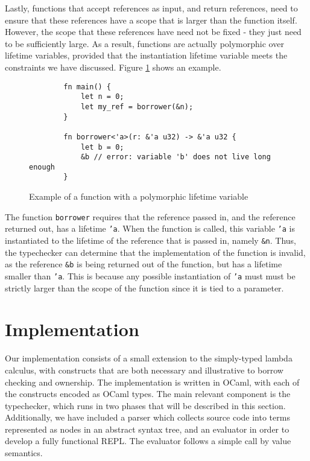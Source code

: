 \documentclass[letterpaper,11pt]{article}
\begin{document}
Lastly, functions that accept references as input, and return references, need to
ensure that these references have a scope that is larger than the function itself.
However, the scope that these references have need not be fixed - they just need
to be sufficiently large. As a result, functions are actually polymorphic over
lifetime variables, provided that the instantiation lifetime variable meets
the constraints we have discussed. Figure \ref{lfpolyex} shows an example.
\begin{figure}[h]
    \begin{lstlisting}
        fn main() {
            let n = 0;
            let my_ref = borrower(&n);
        }

        fn borrower<'a>(r: &'a u32) -> &'a u32 {
            let b = 0;
            &b // error: variable 'b' does not live long enough 
        }
    \end{lstlisting}
    \caption{Example of a function with a polymorphic lifetime variable}
    \label{lfpolyex}
\end{figure}
The function \texttt{borrower} requires that the reference passed in, and the
reference returned out, has a lifetime \texttt{'a}. When the function is called,
this variable \texttt{'a} is instantiated to the lifetime of the reference that
is passed in, namely \texttt{\&n}. Thus, the typechecker can determine that
the implementation of the function is invalid, as the reference \texttt{\&b} is
being returned out of the function, but has a lifetime smaller than \texttt{'a}.
This is because any possible instantiation of \texttt{'a} must must be strictly larger than the scope of the function since
it is tied to a parameter.

\section{Implementation}
Our implementation consists of a small extension to the simply-typed lambda calculus,
with constructs that are both necessary and illustrative to borrow checking and ownership. The
implementation is written in OCaml, with each of the constructs encoded as
OCaml types. The main relevant component is the typechecker, which runs in two
phases that will be described in this section. Additionally, we have included a
parser which collects source code into terms represented as nodes in an abstract syntax tree, 
and an evaluator in order to develop a fully functional REPL. The evaluator follows a simple
call by value semantics.
\end{document}
